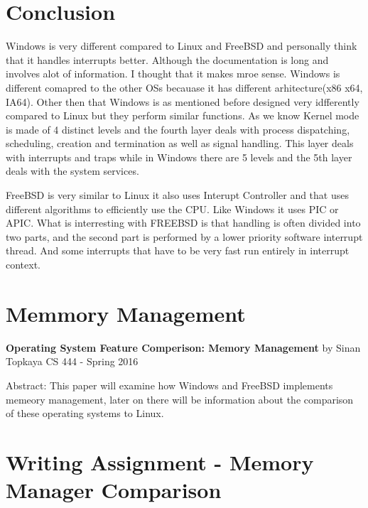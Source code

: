 \documentclass[letterpaper,10pt,draftclsnofoot,onecolumn]{IEEEtran}
\begin{document}
\section*{Conclusion}

Windows is very different compared to Linux and FreeBSD and personally think that it handles interrupts better. Although the documentation is long and involves alot of information. I thought that it makes mroe sense. Windows is different comapred to the other OSs becauase it has different arhitecture(x86 x64, IA64). Other then that Windows is as mentioned before designed very idfferently compared to Linux but they perform similar functions. As we know Kernel mode is made of 4 distinct levels and the fourth layer deals with process dispatching, scheduling, creation and termination as well as signal handling. This layer deals with interrupts and traps while in Windows there are 5 levels and the 5th layer deals with the system services.

FreeBSD is very similar to Linux it also uses Interupt Controller and that uses different algorithms to efficiently use the CPU. Like Windows it uses PIC or APIC. What is interresting with FREEBSD is that handling is often divided into two parts, and the second part is performed by a lower priority software interrupt thread. And some interrupts that have to be very fast run entirely in interrupt context.


\newpage{}
\section{Memmory Management}\label{AppendixD}

\begin{titlepage}
		
		\begin{center}
		\bigbreak	
		\textbf{Operating System Feature Comperison: Memory Management}
		\bigbreak
		by Sinan Topkaya
		\smallbreak
		CS 444 - Spring 2016
		\end{center}
		\vfill
		
		Abstract: This paper will examine how Windows and FreeBSD implements memeory management, later on there will be information about the comparison of these operating systems to Linux. 
		
	\end{titlepage}

\section*{Writing Assignment - Memory Manager Comparison}
\end{document}
